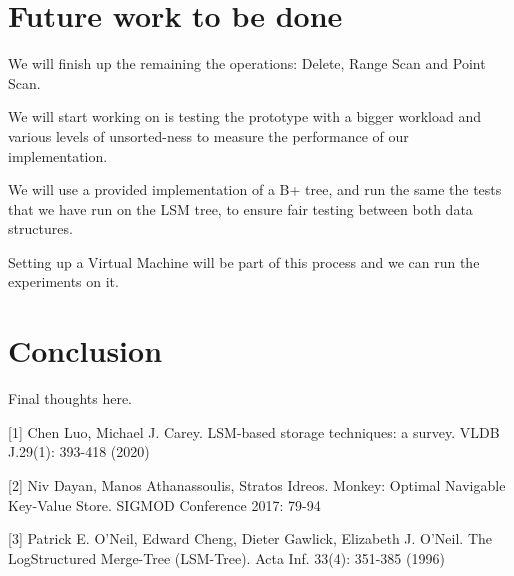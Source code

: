 \documentclass[sigconf]{acmart}
\begin{document}
\section{Future work to be done}

We will finish up the remaining the operations: Delete, Range Scan and Point Scan.

We will start working on is testing the prototype with a bigger workload and various levels of unsorted-ness to measure the performance of our implementation.


We will use a provided implementation of a B+ tree, and run the same the tests that we have run on the LSM tree, to ensure fair testing between both data structures.

Setting up a Virtual Machine will be part of this process and we can run the experiments on it.

\section{Conclusion}

Final thoughts here.

{
    
    

[1] Chen Luo, Michael J. Carey. LSM-based storage techniques: a survey. VLDB J.29(1): 393-418 (2020)

[2] Niv Dayan, Manos Athanassoulis, Stratos Idreos. Monkey: Optimal Navigable
Key-Value Store. SIGMOD Conference 2017: 79-94

[3] Patrick E. O'Neil, Edward Cheng, Dieter Gawlick, Elizabeth J. O'Neil. The LogStructured Merge-Tree (LSM-Tree). Acta Inf. 33(4): 351-385 (1996)
} 
\end{document}
